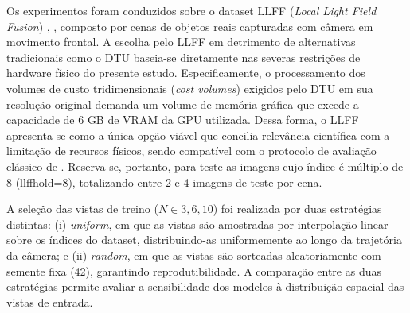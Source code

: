 \documentclass[12pt]{article}
\begin{document}
Os experimentos foram conduzidos sobre o dataset LLFF (\textit{Local Light Field Fusion}) \cite{mildenhall2019locallightfieldfusion}, \cite{mildenhall2020nerfrepresentingscenesneural}, composto por cenas de objetos reais capturadas com câmera em movimento frontal. A escolha pelo LLFF em detrimento de alternativas tradicionais como o DTU baseia-se diretamente nas severas restrições de hardware físico do presente estudo. Especificamente, o processamento dos volumes de custo tridimensionais (\textit{cost volumes}) exigidos pelo DTU em sua resolução original demanda um volume de memória gráfica que excede a capacidade de 6 GB de VRAM da GPU utilizada. Dessa forma, o LLFF apresenta-se como a única opção viável que concilia relevância científica com a limitação de recursos físicos, sendo compatível com o protocolo de avaliação clássico de \cite{niemeyer2022regnerf}. Reserva-se, portanto, para teste as imagens cujo índice é múltiplo de 8 (llffhold=8), totalizando entre 2 e 4 imagens de teste por cena.

A seleção das vistas de treino ($N \in {3, 6, 10}$) foi realizada por duas estratégias distintas: (i) \textit{uniform}, em que as vistas são amostradas por interpolação linear sobre os índices do dataset, distribuindo-as uniformemente ao longo da trajetória da câmera; e (ii) \textit{random}, em que as vistas são sorteadas aleatoriamente com semente fixa (42), garantindo reprodutibilidade. A comparação entre as duas estratégias permite avaliar a sensibilidade dos modelos à distribuição espacial das vistas de entrada.
\end{document}
